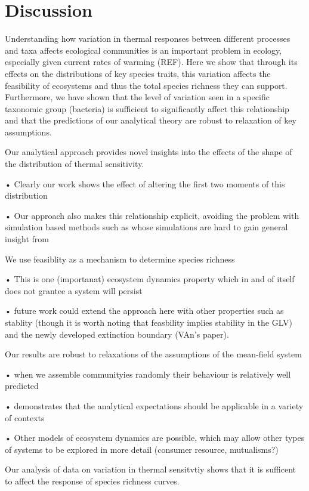 \documentclass{article}
\begin{document}
\section*{Discussion}

Understanding how variation in thermal responses between different processes and taxa affects ecological communities is an important problem in ecology, especially given current rates of warming (REF). Here we show that through its effects on the distributions of key species traits, this variation affects the feasibility of ecosystems and thus the total species richness they can support. Furthermore, we have shown that the level of variation seen in a specific taxonomic group (bacteria) is sufficient to significantly affect this relationship and that the predictions of our analytical theory are robust to relaxation of key assumptions. 

Our analytical approach provides novel insights into the effects of the shape of the distribution of thermal sensitivity.  
    
    • Clearly our work shows the effect of altering the first two moments of this distribution
    
    • Our approach also makes this relationship explicit, avoiding the problem with simulation based methods such as \citet{Stegen2012} whose simulations are hard to gain general insight from

We use feasiblity as a mechanism to determine species richness 
    
    • This is one (importanat) ecosystem dynamics property which in and of itself does not grantee a system will persist
    
    • future work could extend the approach here with other properties such as stablity (though it is worth noting that feasbility implies stability in the GLV) and the newly developed extinction boundary (VAn's paper). 
    
Our results are robust to relaxations of the assumptions of the mean-field system
   
    • when we assemble communityies randomly their behaviour is  relatively well predicted
    
    • demonstrates that the analytical expectations should be applicable in a variety of contexts
    
    • Other models of ecosystem dynamics are possible, which may allow other types of systems to be explored in more detail (consumer resource, mutualisms?)

Our analysis of data on variation in thermal sensitvtiy shows that it is sufficent to affect the response of species richness curves.
    
\end{document}
